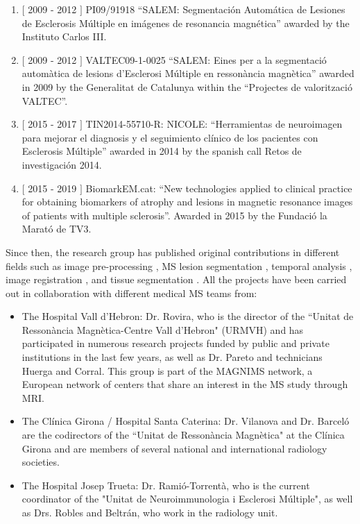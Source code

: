 \begin{enumerate}

\item $[$ 2009 - 2012 $]$ PI09/91918 ``SALEM: Segmentaci\'{o}n Autom\'{a}tica de Lesiones de Esclerosis M\'{u}ltiple en im\'{a}genes de resonancia magn\'{e}tica'' awarded by the Instituto Carlos III. 

\item $[$ 2009 - 2012 $]$ VALTEC09-1-0025 ``SALEM: Eines per a la segmentaci\'{o} autom\`{a}tica de lesions d'Esclerosi M\'{u}ltiple en resson\`{a}ncia magn\`{e}tica'' awarded in 2009 by the Generalitat de Catalunya within the ``Projectes de valoritzaci\'{o} VALTEC''.

\item $[$ 2015 - 2017 $]$ TIN2014-55710-R: NICOLE: ``Herramientas de neuroimagen para mejorar el diagnosis y el seguimiento cl\'{i}nico de los pacientes con Esclerosis M\'{u}ltiple'' awarded in 2014 by the spanish call Retos de investigaci\'{o}n 2014.

\item $[$ 2015 - 2019 $]$ BiomarkEM.cat: ``New technologies applied to clinical practice for obtaining biomarkers of  atrophy and lesions in magnetic resonance images of patients with multiple sclerosis''. Awarded in 2015 by the Fundaci\'{o} la Marat\'{o} de TV3.

\end{enumerate}

Since then, the research group has published original contributions in different fields such as image pre-processing \cite{Roura2014}, MS lesion segmentation \cite{Cabezas2014, Cabezas2014b, Llado2012, Roura2015}, temporal analysis \cite{Ganiler2014,Llado2012b}, image registration \cite{Diez2014, Roura2015b}, and tissue segmentation \cite{Cabezas2011}. All the projects have been carried out in collaboration with different medical MS teams from:

\begin{itemize}

\item The Hospital Vall d'Hebron: Dr. Rovira, who is the director of the ``Unitat de Resson\`{a}ncia Magn\`{e}tica-Centre Vall d'Hebron" (URMVH) and has participated in numerous research projects funded by public and private institutions in the last few years, as well as Dr. Pareto and technicians Huerga and Corral. This group is part of the MAGNIMS network, a European network of centers that share an interest in the MS study through MRI.
 
	 \item The Cl\'{i}nica Girona / Hospital Santa Caterina: Dr. Vilanova and Dr. Barcel\'{o} are the codirectors of the ``Unitat de Resson\`{a}ncia Magn\`{e}tica" at the Cl\'{i}nica Girona and are members of several national and international radiology societies.
 
	\item The Hospital Josep Trueta: Dr. Rami\'{o}-Torrent\`{a}, who is the current coordinator of the "Unitat de Neuroimmunologia i Esclerosi M\'{u}ltiple", as well as Drs. Robles and Beltr\'{a}n, who work in the radiology unit.

\end{itemize}

